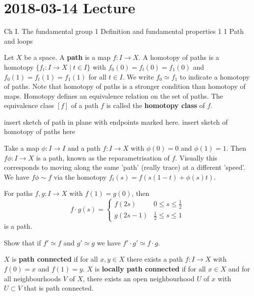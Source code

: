 \section{2018-03-14 Lecture}

Ch I. The fundamental group
1 Definition and fundamental properties
1 1 Path and loops

\begin{defn}
	Let $X$ be a space.
	A \textbf{path} is a map $f:I \to X$.
	A homotopy of paths is a homotopy $\{f_t: I \to X \mid t \in I\}$ with $f_0(0)=f_t(0)=f_1(0)$ and $f_0(1)=f_t(1)=f_1(1)$ for all $t \in I$.
	We write $f_0 \simeq f_1$ to indicate a homotopy of paths.
	Note that homotopy of paths is a stronger condition than homotopy of maps.
	Homotopy defines an equivalence relation on the set of paths.
	The equivalence class $[f]$ of a path $f$ is called the \textbf{homotopy class} of $f$.

	insert sketch of path in plane with endpoints marked here.
	insert sketch of homotopy of paths here
\end{defn}

\begin{exam}
	Take a map $\phi: I \to I$ and a path $f: I \to X$ with $\phi(0)=0$ and $\phi(1)=1$.
	Then $f\phi: I \to X$ is a path, known as the reparametrisation of $f$.
	Visually this corresponds to moving along the same 'path' (really trace) at a different 'speed'.
	We have $f\phi \sim f$ via the homotopy $f_t(s) = f(s(1-t)+\phi(s)t)$.
\end{exam}

\begin{defn}
	For paths $f,g: I \to X$ with $f(1)=g(0)$, then
	\[
	f \cdot g (s) =
	\begin{cases}
		f(2s) & 0 \leq s \leq \frac 12 \\
		g(2s-1) & \frac 12 \leq s \leq 1
	\end{cases}
	\]
	is a path.
\end{defn}

\begin{exer}
	Show that if $f' \simeq f$ and $g' \simeq g$ we have $f' \cdot g' \simeq f \cdot g$.
\end{exer}

\begin{defn}
	\begin{enum}
		\io $X$ is \textbf{path connected} if for all $x,y \in X$ there exists a path $f: I \to X$ with $f(0)=x$ and $f(1)=y$.
		\io $X$ is \textbf{locally path connected} if for all $x \in X$ and for all neighbourhoods $V$ of $X$, there exists an open neighbourhood $U$ of $x$ with $U \subset V$ that is path connected.
	\end{enum}
\end{defn}

